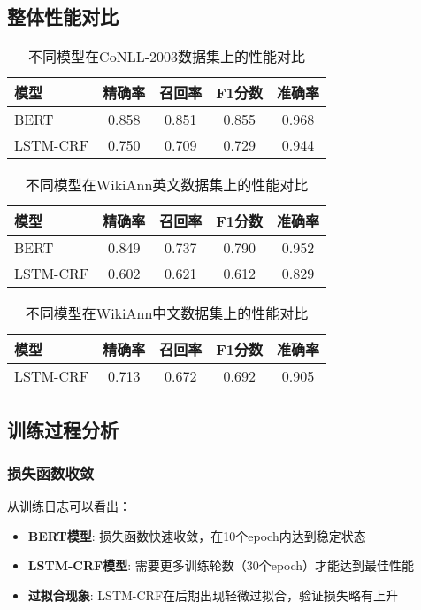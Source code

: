 \documentclass[12pt,a4paper]{article}
\begin{document}
\subsection{整体性能对比}

\begin{table}[H]
\centering
\caption{不同模型在CoNLL-2003数据集上的性能对比}
\begin{tabular}{lcccc}
\toprule
模型 & 精确率 & 召回率 & F1分数 & 准确率 \\
\midrule
BERT & 0.858 & 0.851 & 0.855 & 0.968 \\
LSTM-CRF & 0.750 & 0.709 & 0.729 & 0.944 \\
\bottomrule
\end{tabular}
\end{table}

\begin{table}[H]
\centering
\caption{不同模型在WikiAnn英文数据集上的性能对比}
\begin{tabular}{lcccc}
\toprule
模型 & 精确率 & 召回率 & F1分数 & 准确率 \\
\midrule
BERT & 0.849 & 0.737 & 0.790 & 0.952 \\
LSTM-CRF & 0.602 & 0.621 & 0.612 & 0.829 \\
\bottomrule
\end{tabular}
\end{table}

\begin{table}[H]
\centering
\caption{不同模型在WikiAnn中文数据集上的性能对比}
\begin{tabular}{lcccc}
\toprule
模型 & 精确率 & 召回率 & F1分数 & 准确率 \\
\midrule
LSTM-CRF & 0.713 & 0.672 & 0.692 & 0.905 \\
\bottomrule
\end{tabular}
\end{table}

\subsection{训练过程分析}

\subsubsection{损失函数收敛}

从训练日志可以看出：

\begin{itemize}
    \item \textbf{BERT模型}: 损失函数快速收敛，在10个epoch内达到稳定状态
    \item \textbf{LSTM-CRF模型}: 需要更多训练轮数（30个epoch）才能达到最佳性能
    \item \textbf{过拟合现象}: LSTM-CRF在后期出现轻微过拟合，验证损失略有上升
\end{itemize}
\end{document}
